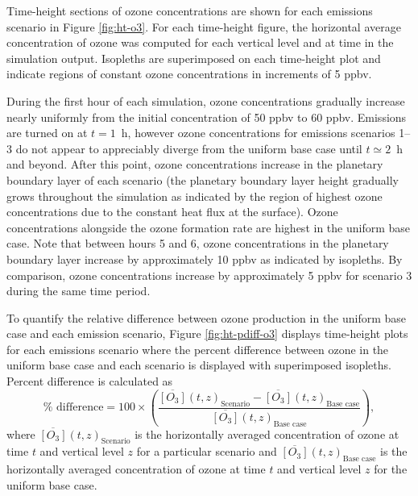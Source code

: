 Time-height sections of ozone concentrations are shown for each emissions scenario in Figure \ref{fig:ht-o3}. For each time-height figure, the horizontal average concentration of ozone was computed for each vertical level and at time in the simulation output. Isopleths are superimposed on each time-height plot and indicate regions of constant ozone concentrations in increments of 5 ppbv. 

During the first hour of each simulation, ozone concentrations gradually increase nearly uniformly from the initial concentration of 50 ppbv to 60 ppbv. Emissions are turned on at $t=1$~h, however ozone concentrations for emissions scenarios 1--3 do not appear to appreciably diverge from the uniform base case until $t\simeq2$~h and beyond. After this point, ozone concentrations increase in the planetary boundary layer of each scenario (the planetary boundary layer height gradually grows throughout the simulation as indicated by the region of highest ozone concentrations due to the constant heat flux at the surface). Ozone concentrations alongside the ozone formation rate are highest in the uniform base case. Note that between hours 5 and 6, ozone concentrations in the planetary boundary layer increase by approximately 10 ppbv as indicated by isopleths. By comparison, ozone concentrations increase by approximately 5 ppbv for scenario 3 during the same time period.

To quantify the relative difference between ozone production in the uniform base case and each emission scenario, Figure \ref{fig:ht-pdiff-o3} displays time-height plots for each emissions scenario where the percent difference between ozone in the uniform base case and each scenario is displayed with superimposed isopleths. Percent difference is calculated as 
\begin{equation}
    \% \text{ difference} = 100\times\left(\frac{\overline{[O_3]}(t, z)_{\text{Scenario}} - \overline{[O_3]}(t, z)_{\text{Base case}}}{\overline{[O_3]}(t, z)_{\text{Base case}}}\right),
\end{equation}
where $\overline{[O_3]}(t, z)_{\text{Scenario}}$ is the horizontally averaged concentration of ozone at time $t$ and vertical level $z$ for a particular scenario and $\overline{[O_3]}(t, z)_{\text{Base case}}$ is the horizontally averaged concentration of ozone at time $t$ and vertical level $z$ for the uniform base case.

